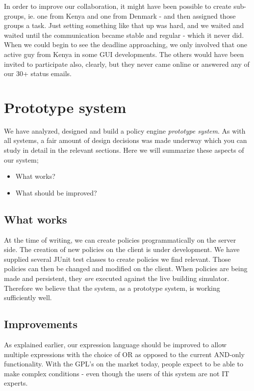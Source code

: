 In order to improve our collaboration, it might have been possible to create sub-groups, ie. one from Kenya and one from Denmark - and then assigned those groups a task. Just setting something like that up was hard, and we waited and waited until the communication became stable and regular - which it never did. When we could begin to see the deadline approaching, we only involved that one active guy from Kenya in some GUI developments. The others would have been invited to participate also, clearly, but they never came online or answered any of our 30+ status emails.

\section{Prototype system}\label{sec:product}
We have analyzed, designed and build a policy engine \textit{prototype system}. As with all systems, a fair amount of design decisions was made underway which you can study in detail in the relevant sections. Here we will summarize these aspects of our system;

\begin{itemize}
	\item What works?
	\item What should be improved?
\end{itemize}

\subsection{What works}
At the time of writing, we can create policies programmatically on the server side. The creation of new policies on the client is under development. We have supplied several JUnit test classes to create policies we find relevant. Those policies can then be changed and modified on the client. When policies are being made and persistent, they \textit{are} executed against the live building simulator. Therefore we believe that the system, as a prototype system, is working sufficiently well.

\subsection{Improvements}\label{subsec:improvements}
As explained earlier, our expression language should be improved to allow multiple expressions with the choice of OR as opposed to the current AND-only functionality. With the GPL's on the market today, people expect to be able to make complex conditions - even though the users of this system are not IT experts. 

